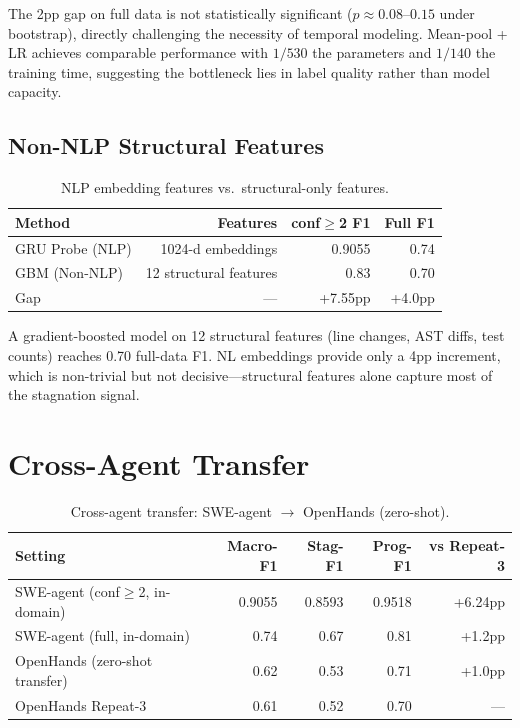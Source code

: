 \documentclass[11pt]{article}
\begin{document}
The 2pp gap on full data is not statistically significant ($p \approx 0.08$--$0.15$ under bootstrap), directly challenging the necessity of temporal modeling.
Mean-pool + LR achieves comparable performance with $1/530$ the parameters and $1/140$ the training time, suggesting the bottleneck lies in label quality rather than model capacity.

\subsection{Non-NLP Structural Features}
\label{sec:non_nlp}

\begin{table}[h]
\centering
\caption{NLP embedding features vs.\ structural-only features.}
\label{tab:non_nlp}
\begin{tabular}{lrrr}
\toprule
\textbf{Method} & \textbf{Features} & \textbf{conf$\geq$2 F1} & \textbf{Full F1} \\
\midrule
GRU Probe (NLP) & 1024-d embeddings & 0.9055 & 0.74 \\
GBM (Non-NLP) & 12 structural features & 0.83 & 0.70 \\
\midrule
Gap & --- & +7.55pp & +4.0pp \\
\bottomrule
\end{tabular}
\end{table}

A gradient-boosted model on 12 structural features (line changes, AST diffs, test counts) reaches 0.70 full-data F1.
NL embeddings provide only a 4pp increment, which is non-trivial but not decisive---structural features alone capture most of the stagnation signal.

\section{Cross-Agent Transfer}
\label{sec:transfer}

\begin{table}[h]
\centering
\caption{Cross-agent transfer: SWE-agent $\to$ OpenHands (zero-shot).}
\label{tab:transfer}
\begin{tabular}{lrrrr}
\toprule
\textbf{Setting} & \textbf{Macro-F1} & \textbf{Stag-F1} & \textbf{Prog-F1} & \textbf{vs Repeat-3} \\
\midrule
SWE-agent (conf$\geq$2, in-domain) & 0.9055 & 0.8593 & 0.9518 & +6.24pp \\
SWE-agent (full, in-domain) & 0.74 & 0.67 & 0.81 & +1.2pp \\
OpenHands (zero-shot transfer) & 0.62 & 0.53 & 0.71 & +1.0pp \\
OpenHands Repeat-3 & 0.61 & 0.52 & 0.70 & --- \\
\bottomrule
\end{tabular}
\end{table}
\end{document}
